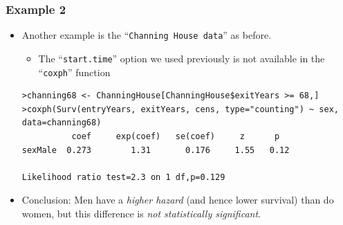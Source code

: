 \documentclass{beamer}
\newcommand{\empr}[1]{{\emph{\color{red}#1}}}
\begin{document}
\pagebreak
\begin{frame}[fragile]
\frametitle{Example 2}
\begin{itemize}
\item Another example is the ``\texttt{Channing House data}'' as before.
\begin{itemize}
\item The ``\texttt{start.time}'' option we used previously is not available in the  ``\texttt{coxph}'' function
\end{itemize}
\begin{Verbatim}
>channing68 <- ChanningHouse[ChanningHouse$exitYears >= 68,] 
>coxph(Surv(entryYears, exitYears, cens, type="counting") ~ sex,
data=channing68)
          coef     exp(coef)   se(coef)     z      p 
sexMale  0.273        1.31       0.176     1.55   0.12

Likelihood ratio test=2.3 on 1 df,p=0.129
\end{Verbatim}
\item Conclusion: Men have a \empr{higher hazard} (and hence lower survival) than do women, but this difference is \empr{not statistically significant}.
\end{itemize}
\end{frame}
\end{document}
